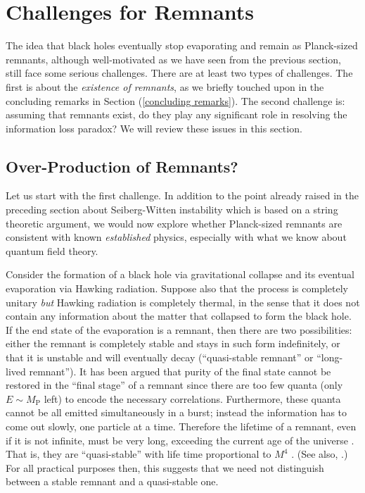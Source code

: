 \documentclass[12pt]{article}
\newcommand{\2}{$^2$}
\newcommand{\3}{$^3$}
\newcommand{\4}{$_4$}
\newcommand{\5}{$_5$}
\begin{document}
\section{Challenges for Remnants}\label{challenges}

The idea that black holes eventually stop evaporating and remain as Planck-sized remnants, although well-motivated as we have seen from the previous section, still face some serious challenges. There are at least two types of challenges. The first is about the \emph{existence of remnants}, as we briefly touched upon in the concluding remarks in Section (\ref{concluding remarks}). The second challenge is: assuming that remnants exist, do they play any significant role in resolving the information loss paradox? We will review these issues in this section. 

\subsection{Over-Production of Remnants?}\label{overproduce}


Let us start with the first challenge. In addition to the point already raised in the preceding section about Seiberg-Witten instability which is based on a string theoretic argument, we would now explore whether Planck-sized remnants are consistent with known \emph{established} physics, especially with what we know about quantum field theory.

Consider the formation of a black hole via gravitational collapse and its eventual evaporation via Hawking radiation. Suppose also that the process is completely unitary \emph{but} Hawking radiation is completely thermal, in the sense that it does not contain any information about the matter that collapsed to form the black hole. If the end state of the evaporation is a remnant, then there are two possibilities: either the remnant is completely stable and stays in such form indefinitely, or that it is unstable and will eventually decay (``quasi-stable remnant'' or ``long-lived remnant''). It has been argued that purity of the final state cannot be restored in the ``final stage'' of a remnant since there are too few quanta (only $E \sim M_\text{P}$ left) to encode the necessary correlations. Furthermore,
these quanta cannot be all emitted simultaneously in a burst; instead the information has to come out slowly, one particle at a time.
Therefore the lifetime of a remnant, even if it is not infinite, must be very long, exceeding the current age of the universe \cite{ACN}. That is, they are ``quasi-stable'' with life time proportional to $M^4$ \cite{preskill}. (See also, \cite{Giddings1, CW}.) For all practical purposes then, this suggests that we need not distinguish between a stable remnant and a quasi-stable one. 
\end{document}
